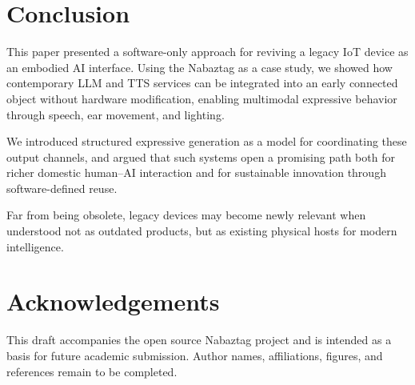 \documentclass[11pt]{article}
\begin{document}
\section{Conclusion}

This paper presented a software-only approach for reviving a legacy IoT device as an embodied AI interface. Using the Nabaztag as a case study, we showed how contemporary LLM and TTS services can be integrated into an early connected object without hardware modification, enabling multimodal expressive behavior through speech, ear movement, and lighting.

We introduced structured expressive generation as a model for coordinating these output channels, and argued that such systems open a promising path both for richer domestic human--AI interaction and for sustainable innovation through software-defined reuse.

Far from being obsolete, legacy devices may become newly relevant when understood not as outdated products, but as existing physical hosts for modern intelligence.

\section*{Acknowledgements}

This draft accompanies the open source Nabaztag project and is intended as a basis for future academic submission. Author names, affiliations, figures, and references remain to be completed.

\printbibliography
\end{document}
